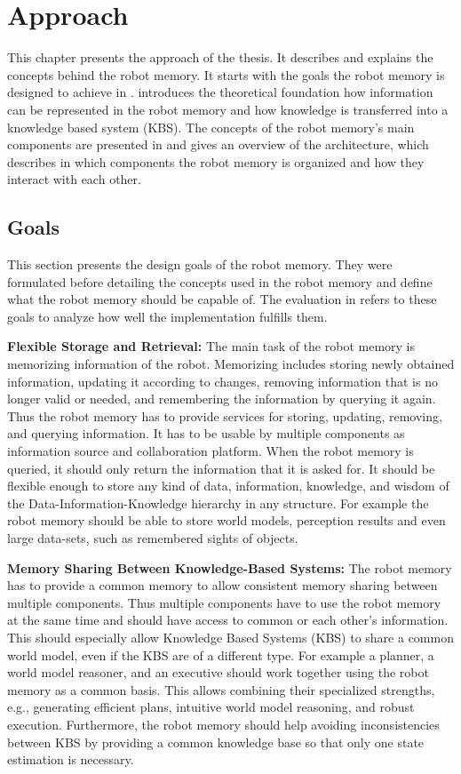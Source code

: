 \chapter{Approach}
\label{chap:approach}
This chapter presents the approach of the thesis. It describes and
explains the concepts behind the robot memory. It starts with the
goals the robot memory is designed to achieve in
.  introduces the theoretical
foundation how information can be represented in the robot memory and
how knowledge is transferred into a knowledge based system (KBS). The
concepts of the robot memory's main components are presented in
 and  gives an overview
of the architecture, which describes in which components the robot
memory is organized and how they interact with each other.

\section{Goals}
\label{sec:goals}
This section presents the design goals of the robot memory. They were
formulated before detailing the concepts used in the robot memory and
define what the robot memory should be capable of. The evaluation in
 refers to these goals to analyze how well
the implementation fulfills them.

\textbf{Flexible Storage and Retrieval:} The main task of
the robot memory is memorizing information of the robot. Memorizing
includes storing newly obtained information, updating it according to
changes, removing information that is no longer valid or needed, and
remembering the information by querying it again. Thus the robot
memory has to provide services for storing, updating, removing, and
querying information.  It has to be usable by multiple components
as information source and collaboration platform.  When the robot memory is queried, it should
only return the information that it is asked for. It should be flexible
enough to store any kind of data, information, knowledge, and wisdom
of the Data-Information-Knowledge hierarchy in any structure. For example the robot memory
should be able to store world models, perception results and even
large data-sets, such as remembered sights of objects.

\textbf{Memory Sharing Between Knowledge-Based Systems:}
The robot memory has to provide a common memory to allow consistent
memory sharing between multiple components. Thus multiple components have to
use the robot memory at the same time and should have access to common
or each other's information. This should especially allow Knowledge
Based Systems (KBS) to share a common world model, even if the KBS are
of a different type. For example a planner, a world model reasoner,
and an executive should work together using the robot memory as a
common basis. This allows combining their specialized strengths,
e.g., generating efficient plans, intuitive world model reasoning, and
robust execution. Furthermore, the robot memory should help avoiding
inconsistencies between KBS by providing a common knowledge base so that
only one state estimation is necessary.


